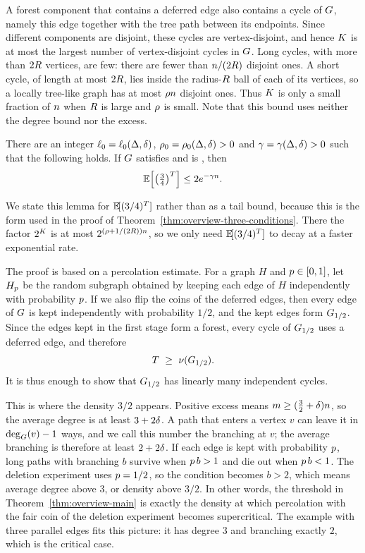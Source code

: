 A forest component that contains a deferred edge also contains a cycle of
\(G\), namely this edge together with the tree path between its endpoints.
Since different components are disjoint, these cycles are vertex-disjoint, and
hence \(K\) is at most the largest number of vertex-disjoint cycles in
\(G\). Long cycles, with more than \(2R\) vertices, are few: there are
fewer than \(n/(2R)\) disjoint ones. A short cycle, of length at most
\(2R\), lies inside the radius-\(R\) ball of each of its vertices, so a
locally tree-like graph has at most \(\rho n\) disjoint ones. Thus
\(K\) is only a small fraction of \(n\) when \(R\) is large and
\(\rho\) is small. Note that this bound uses neither the degree bound nor
the excess.

\begin{lemma}\label{lem:overview-T-bound}
There are an integer \(\ell_0=\ell_0(\Delta,\delta)\),
\(\rho_0=\rho_0(\Delta,\delta)>0\) and \(\gamma=\gamma(\Delta,\delta)>0\) such
that the following holds. If \(G\) satisfies \Hyp{} and is
\loctree{\plenz}{\nontreez}, then
\[
  \Ex{\left(\tfrac34\right)^{\Tdef}}\le 2e^{-\rate\nvert} .
\]
\end{lemma}

We state this lemma for \(\Ex{(3/4)^{\Tdef}}\) rather than as a tail bound,
because this is the form used in the proof of
Theorem~\ref{thm:overview-three-conditions}. There the factor \(2^{K}\) is
at most \(2^{(\rho+1/(2R))n}\), so we only need
\(\Ex{(3/4)^{\Tdef}}\) to decay at a faster exponential rate.

The proof is based on a percolation estimate. For a graph \(H\) and
\(p\in[0,1]\), let \(H_{p}\) be the random subgraph obtained by
keeping each edge of \(H\) independently with probability \(p\). If we
also flip the coins of the deferred edges, then every edge of \(G\) is kept
independently with probability \(1/2\), and the kept edges form
\(G_{1/2}\). Since the edges kept in the first stage form a forest,
every cycle of \(G_{1/2}\) uses a deferred edge, and therefore
\[
  \Tdef\ \ge\ \cyc{\perc{\Gin}{1/2}} .
\]
It is thus enough to show that \(G_{1/2}\) has linearly many
independent cycles.

This is where the density \(3/2\) appears. Positive excess means
\(m\ge(\tfrac32+\delta)n\), so the average degree is at least
\(3+2\delta\). A path that enters a vertex \(v\) can leave it in
\(\deg_{G}(v)-1\) ways, and we call this number the branching at \(v\); the
average branching is therefore at least \(2+2\delta\). If each edge is kept with
probability \(p\), long paths with branching \(b\) survive when
\(p\,b>1\) and die out when \(p\,b<1\). The deletion experiment uses
\(p=1/2\), so the condition becomes \(b>2\), which means average degree
above \(3\), or density above \(3/2\). In other words, the threshold in
Theorem~\ref{thm:overview-main} is exactly the density at which percolation
with the fair coin of the deletion experiment becomes supercritical. The
example with three parallel edges fits this picture: it has degree \(3\) and
branching exactly \(2\), which is the critical case.

